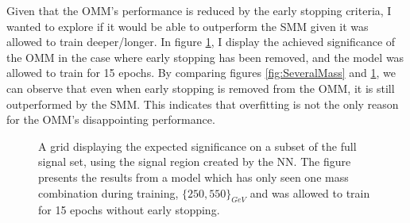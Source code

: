 Given that the \ac{OMM}'s performance is reduced by the early stopping criteria, I wanted to explore if it would be able to outperform the 
\ac{SMM} given it was allowed to train deeper/longer. In figure \ref{fig:NNOverfitting}, I display the achieved significance
of the \ac{OMM} in the case where early stopping has been removed, and the model was allowed to train for 15 epochs. By comparing figures 
\ref{fig:SeveralMass} and \ref{fig:NNOverfitting}, we can observe that even when early stopping is removed from the \ac{OMM}, it is  
still outperformed by the \ac{SMM}. This indicates that overfitting is not the only reason for the \ac{OMM}'s disappointing performance.\\
\begin{figure}[H]
    \centering
    \caption[A grid displaying the expected significance on a subset of the full signal set, using the signal region 
    created by a dense \acs{NN} which has trained on one mass, and has been allowed to train for 16 epochs.]{
    A grid displaying the expected significance on a subset of the full signal set, using the signal region 
    created by the \ac{NN}. The figure presents the results from a model which has only seen one mass combination 
    during training, $\{250,550\}_{GeV}$ and was allowed to train for 15 epochs without 
    early stopping. }
    \label{fig:NNOverfitting}
\end{figure}
